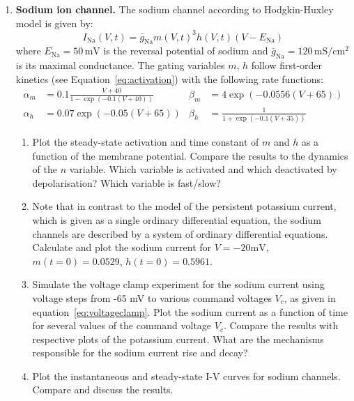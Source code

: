 \documentclass[12pt]{article}
\newcommand{\Na}{\text{Na}}
\begin{document}
\begin{enumerate}
\item \textbf{Sodium ion channel.} The sodium channel according
    to Hodgkin-Huxley model is given by:
    \begin{equation}
        I_{\Na}(V,t)=\bar{g}_{\Na}m(V,t)^3h(V,t)(V-E_{\Na})
    \end{equation}
    where $E_{\Na}=50\,\mathrm{mV}$ is the reversal potential of sodium and
    $\bar{g}_{\Na}=120\,\mathrm{mS/cm^2}$ is its maximal conductance.
    The gating variables $m$, $h$ follow first-order kinetics (see
    Equation~\ref{eq:activation}) with the following rate functions:
    \begin{align}
        \alpha_m&=0.1\frac{V+40}{1-\exp(-0.1(V+40))} &
        \beta_m&=4\exp(-0.0556(V+65)) \\
        \alpha_h&=0.07\exp(-0.05(V+65)) &
        \beta_h&=\frac{1}{1+\exp(-0.1(V+35))}
        \label{eq:Na_gating}
    \end{align}

    \begin{enumerate}
    \item Plot the steady-state activation and time constant of $m$ and $h$ as
        a function of the membrane potential. Compare the results to the
        dynamics of the $n$ variable. Which variable is activated and which
        deactivated by depolarisation? Which variable is fast/slow?
    \item Note that in contrast to the model of the persistent potassium
        current, which is given as a single ordinary differential equation, the
        sodium channels are described by a system of ordinary
        differential equations.
        Calculate and plot the sodium current for $V=-20\text{mV}$,
        $m(t=0)=0.0529$, $h(t=0)=0.5961$.
    \item Simulate the voltage clamp experiment for the sodium current using
        voltage steps from -65 mV to various command voltages $V_c$, as given
        in equation~\ref{eq:voltageclamp}. Plot the sodium current as a
        function of time for several values of the command voltage $V_c$.
        Compare the results with respective plots of the potassium
        current. What are the mechanisms responsible for the sodium
        current rise and decay?
    \item Plot the instantaneous and steady-state I-V curves for sodium
        channels. Compare and discuss the results.
\end{enumerate}


\end{enumerate}
\end{document}
